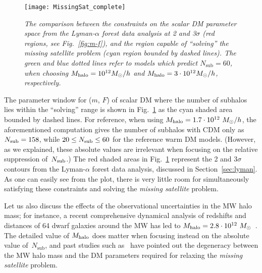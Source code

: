 \documentclass[11pt,nofootinbib]{article}
\numberwithin{equation}{section}
\begin{document}
\begin{figure}[t]
  \begin{center}
  \begin{center}
  \texttt{[image: MissingSat\_complete]}
  \end{center}
   \caption{\emph{The comparison between the constraints on the scalar
   DM parameter space from the Lyman-$\alpha$ forest data analysis at 2
   and 3$\sigma$ (red regions, see Fig.~\ref{fig:m-f}), and the region
   capable of ``solving'' the missing satellite problem (cyan region bounded
   by dashed lines). The green and blue dotted lines refer to models
   which predict $N_{\mathrm{sub}}=60$, 
   when choosing $M_{\rm halo} = 10^{12} M_{\odot} / h$ and $M_{\rm
   halo} = 3 \cdot 10^{12} M_{\odot} / h$, respectively.}}  
  \label{fig:MissingSat}
  \end{center}
\end{figure}

The parameter window for ($m$, $F$) of scalar DM where the
number of subhalos lies within the ``solving'' range is shown in 
Fig.~\ref{fig:MissingSat} as the cyan shaded area bounded by dashed lines.
For reference, when using $M_{\rm halo} = 1.7 \cdot 10^{12}~M_\odot/h$,
the aforementioned computation gives
the number of subhalos with CDM only as $N_{\rm
sub} = 158$, while $20 \leq N_{\rm sub} \leq 60$ for the reference warm DM models.
(However, as we explained, these absolute values are irrelevant when
focusing on the relative suppression of~$N_{\rm sub}$.)
The red shaded areas in Fig.~\ref{fig:MissingSat} represent the 2 and
3$\sigma$ contours from the Lyman-$\alpha$ forest data analysis,
discussed in Section~\ref{sec:lyman}. As one can easily see from the
plot, there is very little room for simultaneously satisfying these
constraints and solving the {\emph{missing satellite}} problem. 

Let us also discuss the effects of the observational
uncertainties in the MW halo mass;
for instance, a recent comprehensive dynamical analysis of redshifts and
distances of 64 dwarf galaxies around the MW has led to $M_{\rm halo} =
2.8 \cdot 10^{12}~M_\odot$~\cite{2017Peebles}.
The detailed value of $M_{\rm halo}$ does matter when focusing
instead on the absolute value of~$N_{\mathrm{sub}}$,
and past studies such as~\cite{Kennedy:2013uta} have pointed out the 
degeneracy between the MW halo mass and the DM
parameters required for relaxing the {\emph{missing satellite}} problem.
\end{document}
